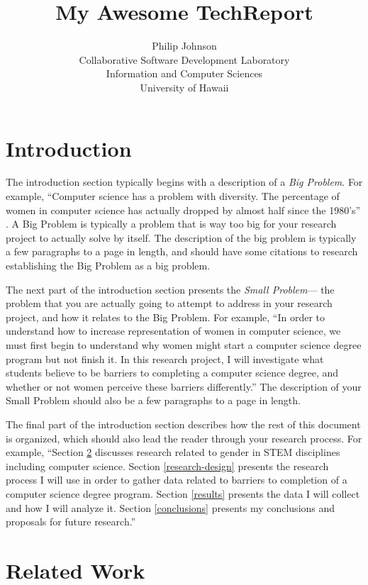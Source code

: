 \documentclass[english]{proposalnsf}
\title{My Awesome TechReport}
\author{Philip Johnson \\Collaborative Software Development Laboratory \\ Information and Computer Sciences \\ University of Hawaii}
\begin{document}
\maketitle
\tableofcontents
\newpage

\section{Introduction}
\label{introduction}

The introduction section typically begins with a description of a {\em Big Problem}.  For example, ``Computer science has a problem with diversity.  The percentage of women in computer science has actually dropped by almost half since the 1980's'' \cite{camp_generation_2017}.  A Big Problem is typically a problem that is way too big for your research project to actually solve by itself. The description of the big problem is typically a few paragraphs to a page in length, and should have some citations to research establishing the Big Problem as a big problem.

The next part of the introduction section presents the {\em Small Problem}--- the problem that you are actually going to attempt to address in your research project, and how it relates to the Big Problem.  For example, ``In order to understand how to increase representation of women in computer science, we must first begin to understand why women might start a computer science degree program but not finish it. In this research project, I will investigate what students believe to be barriers to completing a computer science degree, and whether or not women perceive these barriers differently.''  The description of your Small Problem should also be a few paragraphs to a page in length.

The final part of the introduction section describes how the rest of this document is organized, which should also lead the reader through your research process.  For example, ``Section \ref{related-work} discusses research related to gender in STEM disciplines including computer science.  Section \ref{research-design} presents the research process I will use in order to gather data related to barriers to completion of a computer science degree program.  Section \ref{results} presents the data I will collect and how I will analyze it.  Section \ref{conclusions} presents my conclusions and proposals for future research.''

\section{Related Work}
\label{related-work}
\end{document}
